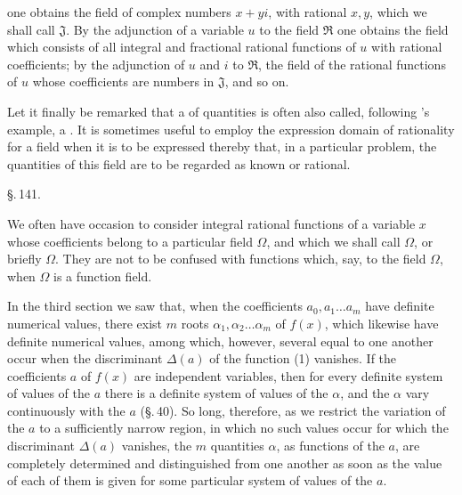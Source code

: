 one obtains the field of complex numbers $x+yi$, with rational $x, y$, which we shall call $\mathfrak{J}$. By the adjunction of a variable $u$ to the field $\mathfrak{R}$ one obtains the field which consists of all integral and fractional rational functions of $u$ with rational coefficients; by the adjunction of $u$ and $i$ to $\mathfrak{R}$, the field of the rational functions of $u$ whose coefficients are numbers in $\mathfrak{J}$, and so on.

Let it finally be remarked that a  of quantities is often also called, following 's example, a . It is sometimes useful to employ the expression domain of rationality for a field when it is to be expressed thereby that, in a particular problem, the quantities of this field are to be regarded as known or rational.

\begin{center}
\S.\,141.

\end{center}

We often have occasion to consider integral rational functions of a variable $x$
whose coefficients belong to a particular field $\Omega$, and which we shall call  $\Omega$, or briefly  $\Omega$. They are not to be confused with functions which, say,  to the field $\Omega$, when $\Omega$ is a function field.

In the third section we saw that, when the coefficients $a_0, a_1 \ldots a_m$ have definite numerical values, there exist $m$ roots $\alpha_1, \alpha_2 \ldots \alpha_m$ of $f(x)$, which likewise have definite numerical values, among which, however, several equal to one another occur when the discriminant $\Delta(a)$ of the function (1) vanishes. If the coefficients $a$ of $f(x)$ are independent variables, then for every definite system of values of the $a$ there is a definite system of values of the $\alpha$, and the $\alpha$ vary continuously with the $a$ (\S.\,40). So long, therefore, as we restrict the variation of the $a$ to a sufficiently narrow region, in which no such values occur for which the discriminant $\Delta(a)$ vanishes, the $m$ quantities $\alpha$, as functions of the $a$, are completely determined and distinguished from one another as soon as the value of each of them is given for some particular system of values of the $a$.
